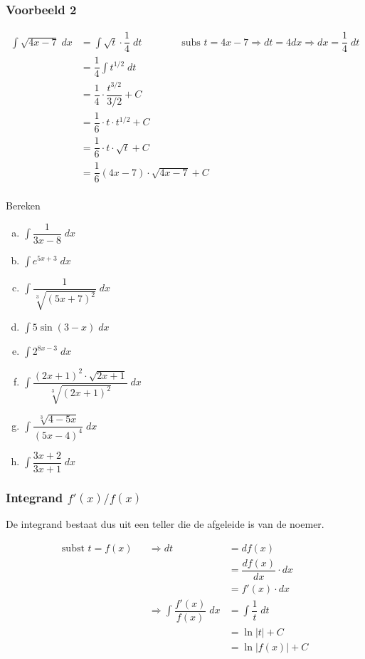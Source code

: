 \documentclass[a4paper,12pt, twoside]{article}
\begin{document}
\subsubsection*{Voorbeeld 2}
\begin{align*}
  \int \sqrt{4x-7} \;dx
  &= \int \sqrt{t} \cdot \dfrac{1}{4} \;dt \qquad\qquad\mbox{subs }t=4x-7 \Rightarrow dt = 4dx \Rightarrow dx = \dfrac{1}{4} \;dt\\
  &= \dfrac{1}{4} \int t^{1/2} \;dt\\
  &= \dfrac{1}{4} \cdot \dfrac{t^{3/2}}{3/2} + C\\
  &= \dfrac{1}{6} \cdot t\cdot t^{1/2} + C\\
  &= \dfrac{1}{6} \cdot t\cdot \sqrt{t} + C\\
  &= \dfrac{1}{6} (4x-7)\cdot \sqrt{4x-7} + C\\
\end{align*}

\begin{oefening}
  Bereken
  \begin{multicols}{2}
  \begin{enumerate}[(a)]
  \item $\displaystyle\int \dfrac{1}{3x-8} \;dx$
  \item $\displaystyle\int e^{5x+3} \;dx$
  \item $\displaystyle\int \dfrac{1}{\sqrt[3]{(5x+7)^2}} \;dx$
  \item $\displaystyle\int 5\sin(3-x) \;dx$
  \item $\displaystyle\int 2^{8x-3} \;dx$
  \item $\displaystyle\int \dfrac{(2x+1)^2 \cdot \sqrt{2x+1}}{\sqrt[3]{(2x+1)^2}} \;dx$
  \item $\displaystyle\int \dfrac{\sqrt[3]{4-5x}}{(5x-4)^4} \;dx$
  \item $\displaystyle\int \dfrac{3x+2}{3x+1} \;dx$
  \end{enumerate}
\end{multicols}
\end{oefening}

\subsubsection{Integrand $f'(x)/f(x)$}

De integrand bestaat dus uit een teller die de afgeleide is van de noemer.

\begin{alignat*}{2}
  \mbox{subst } t = f(x) &&\Rightarrow dt &= df(x)\\
  &&               &= \dfrac{df(x)}{dx} \cdot dx \\
  &&               &= f'(x) \cdot dx\\
  &&\Rightarrow \int \dfrac{f'(x)}{f(x)} \;dx &= \int \dfrac{1}{t} \;dt\\
  &&                                          &= \ln |t| + C\\
  &&                                          &= \ln |f(x)| + C
\end{alignat*}
\end{document}
